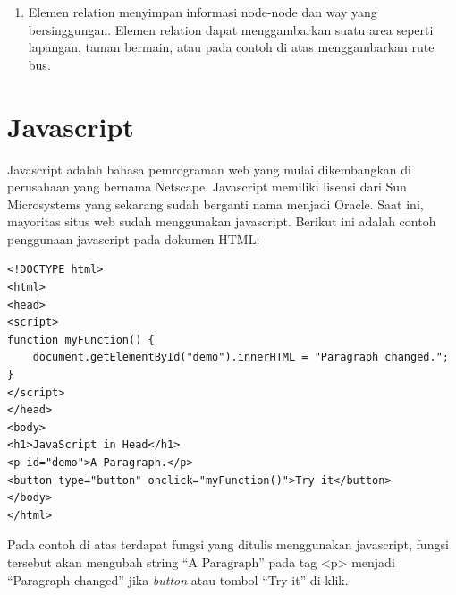 \begin{itemize}
\begin{enumerate}
\item Elemen relation menyimpan informasi node-node dan way yang bersinggungan.
Elemen relation dapat menggambarkan suatu area seperti lapangan, taman bermain, atau
pada contoh di atas menggambarkan rute bus.
\end{enumerate}
\end{itemize}

\section{Javascript}
Javascript adalah bahasa pemrograman web yang mulai dikembangkan di perusahaan
yang bernama Netscape. Javascript memiliki lisensi dari Sun Microsystems yang sekarang sudah berganti nama 
menjadi Oracle. Saat ini, mayoritas situs web sudah menggunakan javascript.
Berikut ini adalah contoh penggunaan javascript pada dokumen HTML:
\lstset{
  language=HTML
}
\begin{lstlisting}
<!DOCTYPE html>
<html>
<head>
<script>
function myFunction() {
    document.getElementById("demo").innerHTML = "Paragraph changed.";
}
</script>
</head>
<body>
<h1>JavaScript in Head</h1>
<p id="demo">A Paragraph.</p>
<button type="button" onclick="myFunction()">Try it</button>
</body>
</html> 
\end{lstlisting}
Pada contoh di atas terdapat fungsi yang ditulis menggunakan javascript,
fungsi tersebut akan mengubah string ``A Paragraph'' pada tag <p> menjadi
``Paragraph changed'' jika \textit{button} atau tombol ``Try it'' di klik.

